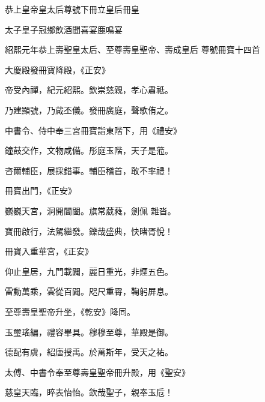 
\begin{pinyinscope}

 恭上皇帝皇太后尊號下冊立皇后冊皇



 太子皇子冠鄉飲酒聞喜宴鹿鳴宴



 紹熙元年恭上壽聖皇太后、至尊壽皇聖帝、壽成皇后
 尊號冊寶十四首



 大慶殿發冊寶降殿，《正安》



 帝受內禪，紀元紹熙。欽崇慈親，孝心肅祗。



 乃建顯號，乃蕆丕儀。發冊廣庭，聲歌侑之。



 中書令、侍中奉三宮冊寶詣東階下，用《禮安》



 鐘鼓交作，文物咸備。彤庭玉階，天子是蒞。



 咨爾輔臣，展採錯事。輔臣稽首，敢不率禮！



 冊寶出門，《正安》



 巍巍天宮，洞開閶闔。旗常葳蕤，劍佩
 雜沓。



 寶冊啟行，法駕繼發。鑠哉盛典，快睹胥悅！



 冊寶入重華宮，《正安》



 仰止皇居，九門載闢，麗日重光，非煙五色。



 雷動萬乘，雲從百闢。咫尺重霄，鞠躬屏息。



 至尊壽皇聖帝升坐，《乾安》降同。



 玉璽瑤編，禮容畢具。穆穆至尊，華殿是御。



 德配有虞，紹唐授禹。於萬斯年，受天之祐。



 太傅、中書令奉至尊壽皇聖帝冊升殿，用《聖安》



 慈皇天臨，睟表怡怡。欽哉聖子，親奉玉卮！




\end{pinyinscope}

